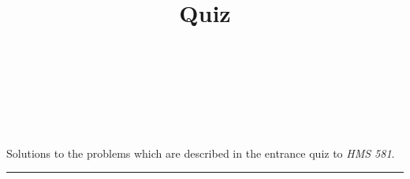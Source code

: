 \documentclass[10pt]{amsart}
\theoremstyle{nonumberplain}
\begin{document}
\pagestyle{empty}

\newcommand{\mline}{\vspace{.2in}\hrule\vspace{.2in}}

\noindent
{} \\
 \\
 \\
 \\

\title{\bf {Quiz} }


\maketitle
\noindent
Solutions to the problems which are described in the entrance quiz to \textit{HMS 581}.
\mline
\end{document}
